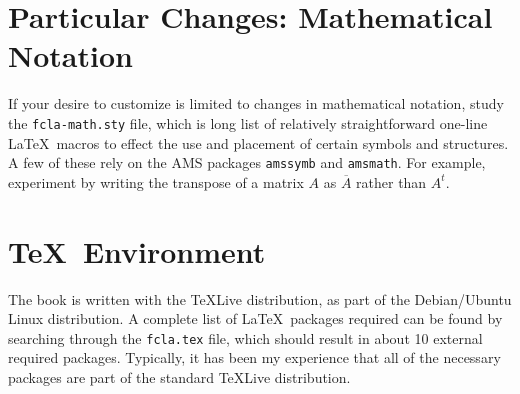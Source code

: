 \documentclass[12pt]{article}
\newcommand{\sourcefile}[1]{{\tt#1}}
\newcommand{\rawtex}[1]{{\tt#1}}
\begin{document}
\section*{Particular Changes: Mathematical Notation}
%
If your desire to customize is limited to changes in mathematical notation, study the \sourcefile{fcla-math.sty} file, which is long list of relatively straightforward one-line \LaTeX\ macros to effect the use and placement of certain symbols and structures.  A few of these rely on the AMS packages \rawtex{amssymb} and \rawtex{amsmath}.  For example, experiment by writing the transpose of a matrix $A$ as $\overline{A}$ rather than $A^t$.
%
\section*{\TeX\ Environment}
%
The book is written with the TeXLive distribution, as part of the Debian/Ubuntu Linux distribution.  A complete list of \LaTeX\ packages required can be found by searching through the \sourcefile{fcla.tex} file, which should result in about 10 external required packages.  Typically, it has been my experience that all of the necessary packages are part of the standard TeXLive distribution.
%
\end{document}
